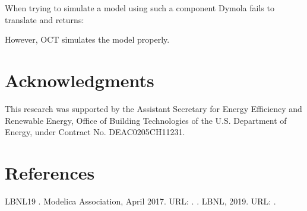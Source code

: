 \documentclass[letterpaper,10pt, openany,english]{sphinxmanual}
\begin{document}

When trying to simulate a model using such a component Dymola fails to translate and returns:

\begin{sphinxVerbatim}[commandchars=\\\{\}]
  \PYG{p}{[}\PYG{p}{]}        
            
\end{sphinxVerbatim}

However, OCT simulates the model properly.


\chapter{Acknowledgments}
\label{\detokenize{acknowledgments:acknowledgments}}\label{\detokenize{acknowledgments::doc}}
This research was supported by the Assistant Secretary for Energy
Efficiency and Renewable Energy, Office of Building Technologies of
the U.S. Department of Energy, under Contract No. DE\sphinxhyphen{}AC02\sphinxhyphen{}05CH11231.


\chapter{References}
\label{\detokenize{bibliography:references}}\label{\detokenize{bibliography:id1}}\label{\detokenize{bibliography::doc}}




\begin{sphinxthebibliography}{LBNL19}
. Modelica Association, April 2017. URL: .
. LBNL, 2019. URL: .
\end{sphinxthebibliography}



\renewcommand{\indexname}{Index}
\printindex
\end{document}

